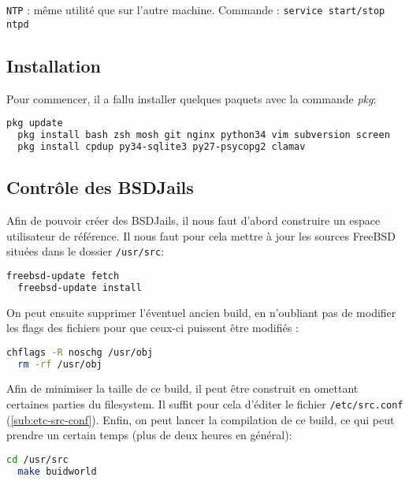 \documentclass[10pt,a4paper]{article}
\begin{document}
\texttt{NTP} : même utilité que sur l'autre machine.
Commande : \texttt{service start/stop ntpd}

\subsection{Installation}
Pour commencer, il a fallu installer quelques paquets avec la commande \emph{pkg}:
\begin{lstlisting}[language=bash]
  pkg update
  pkg install bash zsh mosh git nginx python34 vim subversion screen
  pkg install cpdup py34-sqlite3 py27-psycopg2 clamav
\end{lstlisting}

\subsection{Contrôle des BSDJails}
\label{subs:Contrôle des BSDJails}
Afin de pouvoir créer des BSDJails, il nous faut d'abord construire un espace utilisateur de référence.
Il nous faut pour cela mettre à jour les sources FreeBSD situées dans le dossier \texttt{/usr/src}:
\begin{lstlisting}[language=bash]
  freebsd-update fetch
  freebsd-update install
\end{lstlisting}
On peut ensuite supprimer l'éventuel ancien build, en n'oubliant pas de modifier les flags des fichiers pour que ceux-ci puissent être modifiés :
\begin{lstlisting}[language=bash]
  chflags -R noschg /usr/obj
  rm -rf /usr/obj
\end{lstlisting}
Afin de minimiser la taille de ce build, il peut être construit en omettant certaines parties du filesystem. Il suffit pour cela d'éditer le fichier \texttt{/etc/src.conf} (\ref{sub:etc-src-conf}).
Enfin, on peut lancer la compilation de ce build, ce qui peut prendre un certain temps (plus de deux heures en général):
\begin{lstlisting}[language=bash]
  cd /usr/src
  make buidworld
\end{lstlisting}
\end{document}
